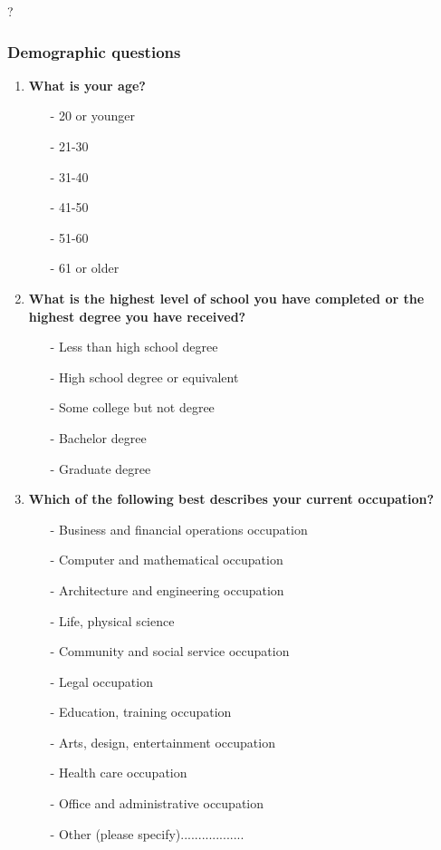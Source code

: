 \documentclass[11pt]{article}
\begin{document}
{ ? }


\subsubsection{Demographic questions}
\begin{enumerate}
\item \textbf{What is your age?}
	\begin{itemize}
	\item[-] 20 or younger
	\item[-] 21-30
	\item[-] 31-40 
	\item[-] 41-50 
	\item[-] 51-60 
	\item[-] 61 or older 
	\end{itemize}

\item \textbf{What is the highest level of school you have completed or the highest degree you have received?}
	\begin{itemize}
	\item[-] Less than high school degree
	\item[-] High school degree or equivalent 
	\item[-] Some college but not degree
	\item[-] Bachelor degree
	\item[-] Graduate degree
	\end{itemize}
	
\item \textbf{Which of the following best describes your current occupation?}
	\begin{itemize}
	\item[-] Business and financial operations occupation
	\item[-] Computer and mathematical occupation
	\item[-] Architecture and engineering occupation
	\item[-] Life, physical science
	\item[-] Community and social service occupation
	\item[-] Legal occupation
	\item[-] Education, training occupation
	\item[-] Arts, design, entertainment occupation
	\item[-] Health care occupation
	\item[-] Office and administrative occupation
	\item[-] Other (please specify)..................
	\end{itemize}
	

\end{enumerate}
\end{document}
